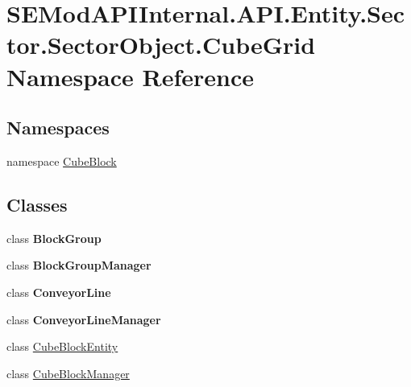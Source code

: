 \hypertarget{namespace_s_e_mod_a_p_i_internal_1_1_a_p_i_1_1_entity_1_1_sector_1_1_sector_object_1_1_cube_grid}{}\section{S\+E\+Mod\+A\+P\+I\+Internal.\+A\+P\+I.\+Entity.\+Sector.\+Sector\+Object.\+Cube\+Grid Namespace Reference}
\label{namespace_s_e_mod_a_p_i_internal_1_1_a_p_i_1_1_entity_1_1_sector_1_1_sector_object_1_1_cube_grid}
\subsection*{Namespaces}
\begin{DoxyCompactItemize}
\item 
namespace \hyperlink{namespace_s_e_mod_a_p_i_internal_1_1_a_p_i_1_1_entity_1_1_sector_1_1_sector_object_1_1_cube_grid_1_1_cube_block}{Cube\+Block}
\end{DoxyCompactItemize}
\subsection*{Classes}
\begin{DoxyCompactItemize}
\item 
class {\bfseries Block\+Group}
\item 
class {\bfseries Block\+Group\+Manager}
\item 
class {\bfseries Conveyor\+Line}
\item 
class {\bfseries Conveyor\+Line\+Manager}
\item 
class \hyperlink{class_s_e_mod_a_p_i_internal_1_1_a_p_i_1_1_entity_1_1_sector_1_1_sector_object_1_1_cube_grid_1_1_cube_block_entity}{Cube\+Block\+Entity}
\item 
class \hyperlink{class_s_e_mod_a_p_i_internal_1_1_a_p_i_1_1_entity_1_1_sector_1_1_sector_object_1_1_cube_grid_1_1_cube_block_manager}{Cube\+Block\+Manager}
\end{DoxyCompactItemize}
